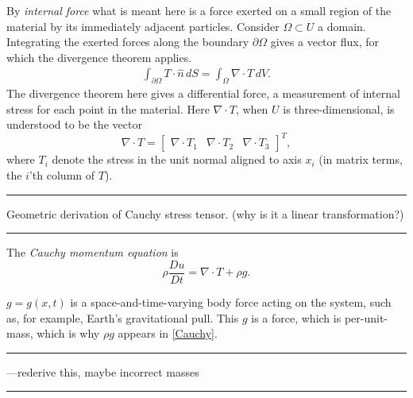 \documentclass[11pt,a4paper]{memoir}
\newcommand{\bb}{\begin{bmatrix}}
\newcommand{\bbe}{\end{bmatrix}}
\newcommand{\todo}[1]{\vskip 0.1in \hrule \vskip 0.03in {#1} \vskip 0.03in \hrule \vskip 0.1in}
\begin{document}
By \textit{internal force} what is meant here is a force exerted on a small region of the material by its immediately adjacent particles.
Consider $\Omega \subset U$ a domain. Integrating the exerted forces along the boundary $\partial\Omega$ gives a vector flux, for which the divergence
theorem applies.
\begin{equation}\label{TDiv}
\begin{split}
    \int_{\partial\Omega} T \cdot \hat{n}\, dS
         = \int_\Omega \nabla \cdot T\, dV.
\end{split}
\end{equation}
The divergence theorem here gives a differential force, a measurement of internal stress for each point in the material.
Here $\nabla \cdot T$, when $U$ is three-dimensional, is understood to be the vector
    $$\nabla \cdot T = \bb \nabla \cdot T_1 & \nabla \cdot T_2 & \nabla \cdot T_3 \bbe^T,$$
where $T_i$ denote the stress in the unit normal aligned to axis $x_i$ (in matrix terms, the $i$'th column of $T$).



\todo{Geometric derivation of Cauchy stress tensor. (why is it a linear transformation?)}


The \textit{Cauchy momentum equation} is
\begin{equation}\label{Cauchy}
    \rho \frac{Du}{Dt} = \nabla \cdot T + \rho g.
\end{equation}

$g = g(x, t)$ is a space-and-time-varying body force acting
on the system, such as, for example, Earth's gravitational pull.
This $g$ is a force, which is per-unit-mass, which is why
$\rho g$ appears in \eqref{Cauchy}.
\todo{---rederive this, maybe incorrect masses}
\end{document}
